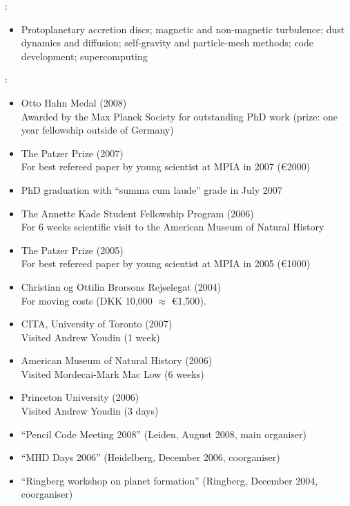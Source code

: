 \documentclass{article}
\begin{document}
\newpage
{}:
\begin{itemize}
  \item Protoplanetary accretion discs; magnetic and non-magnetic
    turbulence; dust dynamics and diffusion; self-gravity and particle-mesh
    methods; code development; supercomputing
\end{itemize}
:
\begin{itemize}
  \item Otto Hahn Medal (2008)\\
    Awarded by the Max Planck Society for outstanding PhD work (prize: one year
    fellowship outside of Germany)
  \item The Patzer Prize (2007)\\
    For best refereed paper by young scientist at MPIA in 2007 (\euro{2000})
  \item PhD graduation with ``summa cum laude'' grade in July 2007
  \item The Annette Kade Student Fellowship Program (2006)\\
    For 6 weeks scientific visit to the American Museum of Natural History
  \item The Patzer Prize (2005)\\
      For best refereed paper by young scientist at MPIA in 2005 (\euro{1000})
  \item Christian og Ottilia Brorsons Rejselegat (2004)\\
    For moving costs (DKK 10,000 $\approx$ \euro{1,500}).
\end{itemize}

\begin{itemize}
  \item CITA, University of Toronto (2007)\\
    Visited Andrew Youdin (1 week)
  \item American Museum of Natural History (2006)\\
    Visited Mordecai-Mark Mac Low (6 weeks)
  \item Princeton University (2006)\\
    Visited Andrew Youdin (3 days)
\end{itemize}

\begin{itemize} 
  \item ``Pencil Code Meeting 2008'' (Leiden, August 2008, main organiser)
  \item ``MHD Days 2006'' (Heidelberg, December 2006, coorganiser)
  \item ``Ringberg workshop on planet formation'' (Ringberg, December 2004,
  coorganiser)
\end{itemize}
\end{document}
